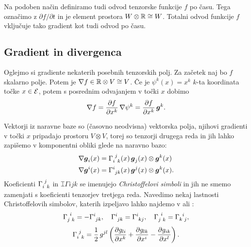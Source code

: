 Na podoben način definiramo tudi odvod tenzorske funkcije $f$ po času. Tega označimo z $\partial f/\partial t$
in je element prostora $W\otimes\mathbb R\cong W$. Totalni odvod funkcije $f$ vključuje tako gradient kot tudi odvod po času.

\subsection{Gradient in divergenca}

Oglejmo si gradiente nekaterih posebnih tenzorskih polj. Za začetek naj bo $f$ skalarno polje. Potem je
$\nabla f \in \mathbb R\otimes V \cong V$. Če je
$\psi^k(x)=x^k$ $k$-ta koordinata točke $x\in\mathcal E$, potem s posrednim odvajanjem v točki $x$ dobimo
\begin{equation*}
	\nabla f=\frac{\partial f}{\partial x^k}\,\nabla\psi^k=\frac{\partial f}{\partial x^k}\,\boldsymbol g^k.
\end{equation*}

Vektorji iz naravne baze so (časovno neodvisna) vektorska polja, njihovi gradienti v točki
$x$ pripadajo prostoru $V\otimes V$, torej
so tenzorji drugega reda in jih lahko zapišemo v komponentni obliki glede na naravno bazo:
\begin{align*}
	\nabla \vek{g}_i(x)&=\cs{i}{j}{k}(x)\,\vek{g}_j(x)\otimes\vek{g}^k(x)\\
	\nabla \vek{g}^i(x)&=\topbot{\Gamma}{i}{jk}(x)\,\vek{g}^j(x)\otimes\vek{g}^k(x).
\end{align*}
Koeficienti $\cs{i}{j}{k}$ in $\topbot{\Gamma}{i}{jk}$ se imenujejo \emph{Christoffelovi simboli} in
jih ne smemo zamenjati s koeficienti tenzorjev tretjega reda. Navedimo nekaj lastnosti Christoffelovih
simbolov, katerih izpeljavo lahko najdemo v \cite[str. 275--277]{liu} ali \cite[str. 59]{haupt}:
\begin{equation*}
	\cs{j}{i}{k}=-\topbot{\Gamma}{i}{jk},\quad \topbot{\Gamma}{i}{jk}=\topbot{\Gamma}{i}{kj},\quad
	\cs{j}{i}{k}=\cs{k}{i}{j},
\end{equation*}
\begin{equation*}
	\cs{i}{j}{k}=\frac{1}{2}\,g^{jl}\left(\frac{\partial g_{li}}{\partial x^k}+
	\frac{\partial g_{lk}}{\partial x^i}-\frac{\partial g_{ik}}{\partial x^l}\right).
\end{equation*}

